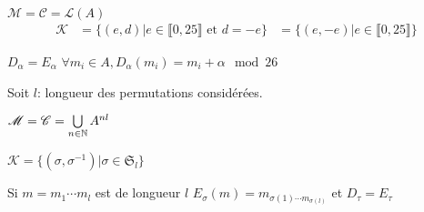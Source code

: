 \documentclass[a4paper, 12pt]{article}
\begin{document}
\begin{exemple}[César]
    $\mathscr{M} = \mathscr{C} = \mathscr{L}(A)$\n
    \begin{align*}
        \mathscr{K}&=\{(e, d) | e \in \llbracket 0, 25 \rrbracket \text{ et } d = -e\}
        &=\{(e, -e) | e \in \llbracket 0, 25 \rrbracket\}
    \end{align*}

    $D_\alpha = E_\alpha$\n
    $\forall m_i \in A, D_\alpha(m_i) = m_i + \alpha \mod 26$
\end{exemple}

\begin{exemple}
    Soit $l$: longueur des permutations considérées.

    $\mathscr{M} = \mathscr{C} = \bigcup\limits_{n \in \mathbb{N}}A^{nl}$

    $\mathscr{K} = \{(\sigma, \sigma^{-1}) | \sigma \in \mathfrak{S}_l\}$

    Si $m = m_1 \cdots m_l$ est de longueur $l$\n
    $E_\sigma(m) = m_{\sigma(1) \cdots m_{\sigma(l)}}$
    et $D_\tau = E_\tau$
\end{exemple}
\end{document}

